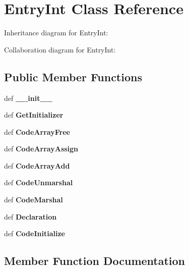 \section{\-Entry\-Int \-Class \-Reference}
\label{classevent__rpcgen_1_1_entry_int}


\-Inheritance diagram for \-Entry\-Int\-:


\-Collaboration diagram for \-Entry\-Int\-:
\subsection*{\-Public \-Member \-Functions}
\begin{DoxyCompactItemize}
\item 
def {\bfseries \-\_\-\-\_\-init\-\_\-\-\_\-}\label{classevent__rpcgen_1_1_entry_int_ac775ee34451fdfa742b318538164070e}

\item 
def {\bfseries \-Get\-Initializer}\label{classevent__rpcgen_1_1_entry_int_acc967744885bfbdf0f0aeed27c888d23}

\item 
def {\bfseries \-Code\-Array\-Free}\label{classevent__rpcgen_1_1_entry_int_a6041961df8fdc24bd66777ade5b196c5}

\item 
def {\bfseries \-Code\-Array\-Assign}\label{classevent__rpcgen_1_1_entry_int_a4a82db0bf599d23f74a63843f450cea5}

\item 
def {\bf \-Code\-Array\-Add}
\item 
def {\bfseries \-Code\-Unmarshal}\label{classevent__rpcgen_1_1_entry_int_a4f7edbd130c034cfa9d24b7be679f8af}

\item 
def {\bfseries \-Code\-Marshal}\label{classevent__rpcgen_1_1_entry_int_ae994601ffc7e740cede6cb32d6d4f55a}

\item 
def {\bfseries \-Declaration}\label{classevent__rpcgen_1_1_entry_int_a564a165c99a4874ce9135fc27e62cebc}

\item 
def {\bfseries \-Code\-Initialize}\label{classevent__rpcgen_1_1_entry_int_a24ae658809888439abef27b3633d22a0}

\end{DoxyCompactItemize}


\subsection{\-Member \-Function \-Documentation}
